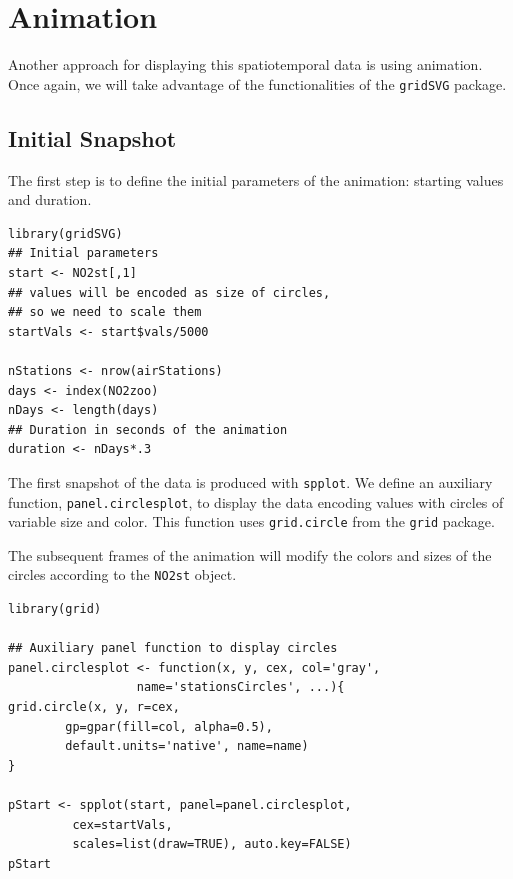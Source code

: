 \section{\floweroneleft Animation}
\label{sec-4}
Another approach for displaying this spatiotemporal data is using
animation. Once again, we will take advantage of the functionalities
of the \texttt{gridSVG} package.

\subsection{Initial Snapshot}
\label{sec-4-1}
The first step is to define the initial parameters of the animation:
starting values and duration.


\lstset{language=R,numbers=none}
\begin{lstlisting}
library(gridSVG)
## Initial parameters
start <- NO2st[,1]
## values will be encoded as size of circles,
## so we need to scale them
startVals <- start$vals/5000

nStations <- nrow(airStations)
days <- index(NO2zoo)
nDays <- length(days)
## Duration in seconds of the animation
duration <- nDays*.3
\end{lstlisting}

The first snapshot of the data is produced with \texttt{spplot}. We define an
auxiliary function, \texttt{panel.circlesplot}, to display the data encoding
values with circles of variable size and color.  This function
uses \texttt{grid.circle} from the \texttt{grid} package.  

The subsequent frames of the animation will modify the colors and
sizes of the circles according to the \texttt{NO2st} object.


\lstset{language=R,numbers=none}
\begin{lstlisting}
library(grid)

## Auxiliary panel function to display circles
panel.circlesplot <- function(x, y, cex, col='gray',
			      name='stationsCircles', ...){
grid.circle(x, y, r=cex,
	    gp=gpar(fill=col, alpha=0.5),
	    default.units='native', name=name)
}

pStart <- spplot(start, panel=panel.circlesplot,
		 cex=startVals,
		 scales=list(draw=TRUE), auto.key=FALSE)
pStart
\end{lstlisting}
